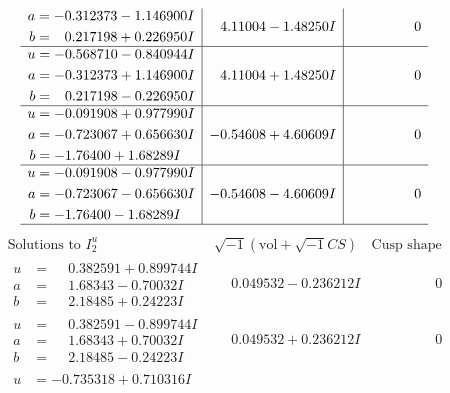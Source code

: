 \documentclass[1p]{elsarticle_modified}
\theoremstyle{definition}
\newcommand{\I}{\sqrt{-1}}
\begin{document}
$$\begin{array}{c|c|c}
\begin{aligned}
a &= -0.312373 - 1.146900 I \\
b &= \phantom{-}0.217198 + 0.226950 I\end{aligned}
 & \phantom{-}4.11004 - 1.48250 I & \phantom{-0.000000 } 0 \\ \hline\begin{aligned}
u &= -0.568710 - 0.840944 I \\
a &= -0.312373 + 1.146900 I \\
b &= \phantom{-}0.217198 - 0.226950 I\end{aligned}
 & \phantom{-}4.11004 + 1.48250 I & \phantom{-0.000000 } 0 \\ \hline\begin{aligned}
u &= -0.091908 + 0.977990 I \\
a &= -0.723067 + 0.656630 I \\
b &= -1.76400 + 1.68289 I\end{aligned}
 & -0.54608 + 4.60609 I & \phantom{-0.000000 } 0 \\ \hline\begin{aligned}
u &= -0.091908 - 0.977990 I \\
a &= -0.723067 - 0.656630 I \\
b &= -1.76400 - 1.68289 I\end{aligned}
 & -0.54608 - 4.60609 I & \phantom{-0.000000 } 0\\
 \hline 
 \end{array}$$\newpage$$\begin{array}{c|c|c}  
\text{Solutions to }I^u_{2}& \I (\text{vol} + \sqrt{-1}CS) & \text{Cusp shape}\\
 \hline 
\begin{aligned}
u &= \phantom{-}0.382591 + 0.899744 I \\
a &= \phantom{-}1.68343 - 0.70032 I \\
b &= \phantom{-}2.18485 + 0.24223 I\end{aligned}
 & \phantom{-}0.049532 - 0.236212 I & \phantom{-0.000000 } 0 \\ \hline\begin{aligned}
u &= \phantom{-}0.382591 - 0.899744 I \\
a &= \phantom{-}1.68343 + 0.70032 I \\
b &= \phantom{-}2.18485 - 0.24223 I\end{aligned}
 & \phantom{-}0.049532 + 0.236212 I & \phantom{-0.000000 } 0 \\ \hline\begin{aligned}
u &= -0.735318 + 0.710316 I \\

\end{aligned}
\end{array}$$
\end{document}
